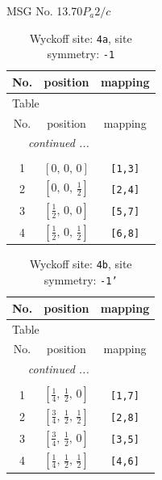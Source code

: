 \documentclass[fleqn,8pt]{jsarticle}
\begin{document}
\setcounter{MaxMatrixCols}{32}

\renewcommand{\tablename}{Table~}
\renewcommand{\figurename}{Figure~}
\begin{center}
\LARGE
MSG No. 13.70\quad$P_{a}2/c$
\end{center}
\renewcommand{\arraystretch}{1.2}
\begin{longtable}{ccc}
\caption{Wyckoff site: {\tt 4a}, site symmetry: {\tt -1}}
 \\
 \hline \hline
No. & position & mapping \\ \hline \endfirsthead

\multicolumn{2}{l}{\tablename\ \thetable{}} \\
 \hline \hline
No. & position & mapping \\ \hline \endhead

 \hline \hline
\multicolumn{2}{r}{\footnotesize\it continued ...} \\ \endfoot

 \hline \hline
\multicolumn{2}{r}{} \\ \endlastfoot

1 & $\left[ 0,\, 0,\, 0 \right]$ & {\tt [1,3]} \\ \hline
2 & $\left[ 0,\, 0,\, \frac{1}{2} \right]$ & {\tt [2,4]} \\ \hline
3 & $\left[ \frac{1}{2},\, 0,\, 0 \right]$ & {\tt [5,7]} \\ \hline
4 & $\left[ \frac{1}{2},\, 0,\, \frac{1}{2} \right]$ & {\tt [6,8]} \\
\end{longtable}
\renewcommand{\arraystretch}{1.2}
\begin{longtable}{ccc}
\caption{Wyckoff site: {\tt 4b}, site symmetry: {\tt -1'}}
 \\
 \hline \hline
No. & position & mapping \\ \hline \endfirsthead

\multicolumn{2}{l}{\tablename\ \thetable{}} \\
 \hline \hline
No. & position & mapping \\ \hline \endhead

 \hline \hline
\multicolumn{2}{r}{\footnotesize\it continued ...} \\ \endfoot

 \hline \hline
\multicolumn{2}{r}{} \\ \endlastfoot

1 & $\left[ \frac{1}{4},\, \frac{1}{2},\, 0 \right]$ & {\tt [1,7]} \\ \hline
2 & $\left[ \frac{3}{4},\, \frac{1}{2},\, \frac{1}{2} \right]$ & {\tt [2,8]} \\ \hline
3 & $\left[ \frac{3}{4},\, \frac{1}{2},\, 0 \right]$ & {\tt [3,5]} \\ \hline
4 & $\left[ \frac{1}{4},\, \frac{1}{2},\, \frac{1}{2} \right]$ & {\tt [4,6]} \\
\end{longtable}
\end{document}

